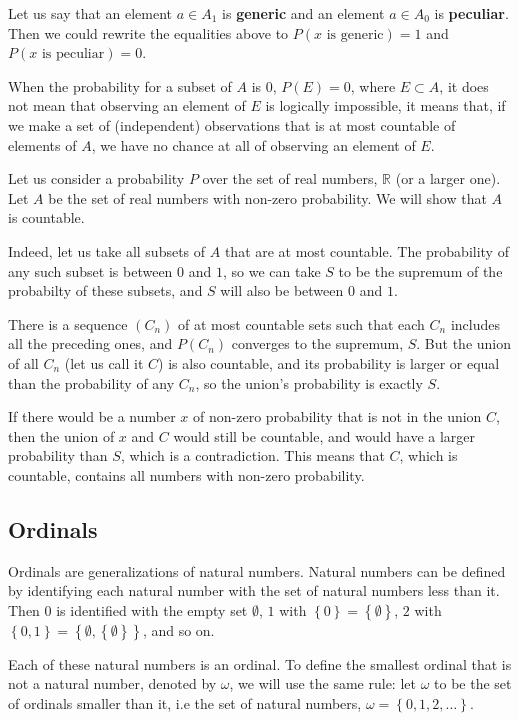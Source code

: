 \documentclass[a4paper
,draft
]{article}
\def\reale{\mathbb{R}}
\newcommand{\multime}[1]{\left\{ #1 \right\}}
\newcommand{\definitie}[1]{\textbf{#1}}
\begin{document}
Let us say that an element $a\in A_1$ is \definitie{generic}
and an element $a\in A_0$ is \definitie{peculiar}. Then we could rewrite
the equalities above to $P(x\mbox{ is generic}) = 1$ and
$P(x\mbox{ is peculiar}) = 0$.

When the probability for a subset of $A$ is $0$, $P(E)=0$, where $E\subset A$,
it does not mean that observing an element of $E$ is logically impossible,
it means that,
if we make a set of (independent) observations that is at most countable
of elements of $A$, we have no chance at all of observing an element of $E$.

Let us consider a probability $P$ over the set of real numbers, $\reale$ (or
a larger one). Let $A$ be the set of real numbers with non-zero probability.
We will show that $A$ is countable.

Indeed, let us take all subsets of $A$ that are at most countable. The
probability of any such subset is between $0$ and $1$, so we can take
$S$ to be the supremum of the probabilty of these subsets, and
$S$ will also be between $0$ and $1$.

There is a sequence $(C_n)$ of at most countable sets such that each $C_n$
includes all the preceding ones, and $P(C_n)$ converges to the supremum, $S$.
But the union of all $C_n$ (let us call it $C$) is also countable,
and its probability is larger or equal than the probability of any $C_n$,
so the union's probability is exactly $S$.

If there would be a number $x$ of non-zero probability that is not in the
union $C$, then the union of $x$ and $C$ would still be countable, and
would have a larger probability than $S$, which is a contradiction.
This means that $C$, which is countable, contains all numbers with non-zero
probability.

\subsection{Ordinals}
\label{sec:ordinals}

Ordinals are generalizations of natural numbers. Natural numbers can be
defined by identifying each natural number with the set of natural numbers less
than it. Then $0$ is identified with the empty set $\emptyset$,
$1$ with $\multime{0}=\multime{\emptyset}$,
$2$ with $\multime{0, 1}=\multime{\emptyset, \multime{\emptyset}}$,
and so on.

Each of these natural numbers is an ordinal. To define the smallest ordinal
that is not a natural number, denoted by $\omega$, we will use the
same rule: let $\omega$ to be the set of ordinals smaller than it, i.e
the set of natural numbers, $\omega=\multime{0, 1, 2, \dots}$.
\end{document}
